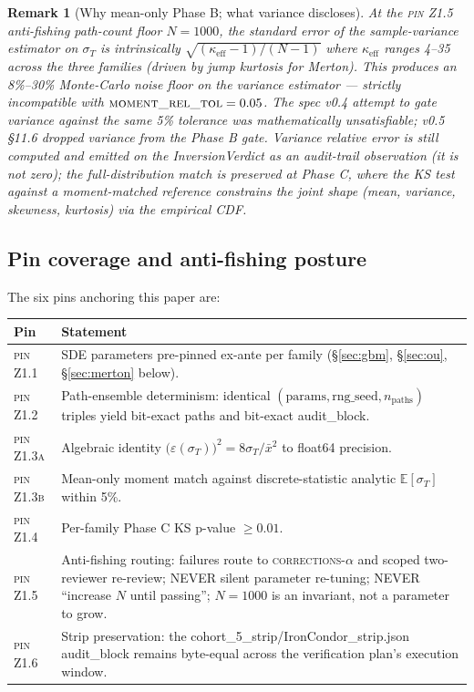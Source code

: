 \documentclass[11pt,letterpaper]{article}
\newtheorem{remark}{Remark}[section]
\newcommand{\E}{\mathbb{E}}
\newcommand{\sigmaT}{\sigma_{T}}
\newcommand{\epsT}{\varepsilon(\sigmaT)}
\newcommand{\xbar}{\bar{x}}
\newcommand{\PinZ}[1]{\textsc{pin Z1.#1}}
\begin{document}
\begin{remark}[Why mean-only Phase B; what variance discloses]
\label{rem:mean-only}
At the \PinZ{5} anti-fishing path-count floor $N = 1000$, the standard
error of the sample-variance estimator on $\sigmaT$ is intrinsically
$\sqrt{(\kappa_{\text{eff}} - 1)/(N-1)}$ where $\kappa_{\text{eff}}$
ranges 4--35 across the three families (driven by jump kurtosis for
Merton). This produces an 8\%--30\% Monte-Carlo noise floor on the
variance estimator — strictly incompatible with
$\textsc{moment\_rel\_tol} = 0.05$. The spec v0.4 attempt to gate
variance against the same 5\% tolerance was mathematically
unsatisfiable; v0.5 \S11.6 dropped variance from the Phase B gate.
Variance relative error is still computed and emitted on the
\textsf{InversionVerdict} as an audit-trail observation (it is not
zero); the full-distribution match is preserved at Phase C, where the
KS test against a moment-matched reference constrains the joint shape
(mean, variance, skewness, kurtosis) via the empirical CDF.
\end{remark}

\subsection{Pin coverage and anti-fishing posture}
\label{sec:framework:pins}

The six pins anchoring this paper are:

\begin{center}
\begin{tabular}{@{}lp{}@{}}
\toprule
\textbf{Pin} & \textbf{Statement} \\
\midrule
\PinZ{1} & SDE parameters pre-pinned ex-ante per family (\S\ref{sec:gbm}, \S\ref{sec:ou}, \S\ref{sec:merton} below). \\
\PinZ{2} & Path-ensemble determinism: identical
            $(\text{params}, \text{rng\_seed}, n_{\text{paths}})$
            triples yield bit-exact paths and bit-exact audit\_block. \\
\PinZ{3a} & Algebraic identity \(\bigl(\epsT\bigr)^{2} = 8\sigmaT/\xbar^{2}\)
            to float64 precision. \\
\PinZ{3b} & Mean-only moment match against discrete-statistic analytic
            $\E[\sigmaT]$ within 5\%. \\
\PinZ{4} & Per-family Phase C KS p-value $\geq 0.01$. \\
\PinZ{5} & Anti-fishing routing: failures route to \textsc{corrections-$\alpha$}
            and scoped two-reviewer re-review; NEVER silent parameter
            re-tuning; NEVER ``increase $N$ until passing''; \(N=1000\)
            is an invariant, not a parameter to grow. \\
\PinZ{6} & Strip preservation: the
            \textsf{cohort\_5\_strip}/\textsf{IronCondor\_strip.json}
            audit\_block remains byte-equal across the verification
            plan's execution window. \\
\bottomrule
\end{tabular}
\end{center}
\end{document}
